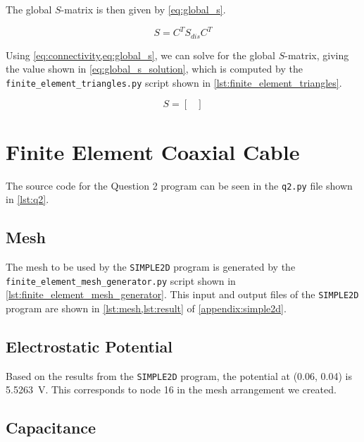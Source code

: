 \documentclass[a4paper,titlepage]{article}
\begin{document}
	The global $S$-matrix is then given by \cref{eq:global_s}.
	
	\begin{equation} \label{eq:global_s}
		S = C^T S_{dis} C^T
	\end{equation}
	
	Using \cref{eq:connectivity,eq:global_s}, we can solve for the global $S$-matrix, giving the value shown in \cref{eq:global_s_solution}, which is computed by the \texttt{finite_element_triangles.py} script shown in \cref{lst:finite_element_triangles}.
	
	\begin{equation} \label{eq:global_s_solution}
		S =
			\begin{bmatrix}
				
			\end{bmatrix}
	\end{equation}
	
	\section{Finite Element Coaxial Cable}
	
	The source code for the Question 2 program can be seen in the \texttt{q2.py} file shown in \cref{lst:q2}.
	
	\subsection{Mesh}
	
	The mesh to be used by the \texttt{SIMPLE2D} program is generated by the \texttt{finite_element_mesh_generator.py} script shown in \cref{lst:finite_element_mesh_generator}. This input and output files of the \texttt{SIMPLE2D} program are shown in \cref{lst:mesh,lst:result} of \autoref{appendix:simple2d}.
	
	\subsection{Electrostatic Potential}
	
	Based on the results from the \texttt{SIMPLE2D} program, the potential at (0.06, 0.04) is \SI{5.5263}{\volt}. This corresponds to node 16 in the mesh arrangement we created.
	
	\subsection{Capacitance}
	
\end{document}
